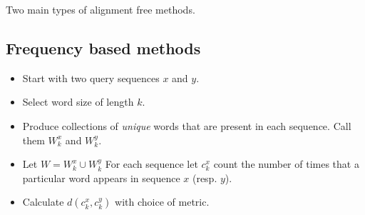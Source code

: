 Two main types of alignment free methods.

\subsection{Frequency based methods}
    \begin{itemize}
    \item Start with two query sequences $x$ and $y$.  
    \item Select word size of length $k$.
    \item Produce collections of \emph{unique} words that are present in each sequence. Call them $W_k^x$ and $W_k^y$.
    \item Let $W = W_k^x \cup W_k^y$
    \itme For each sequence let $c_k^x$ count the number of times that a particular word appears in sequence $x$ (resp. $y$).
    \item Calculate $d(c_k^x,c_k^y)$ with choice of metric. 
    
\subsection{}
    \end{itemize}
